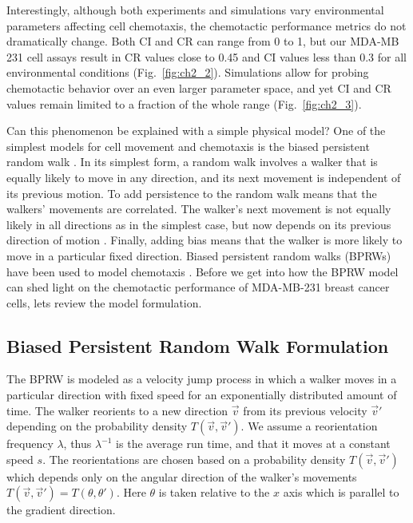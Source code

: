 Interestingly, although both experiments and simulations vary environmental parameters affecting cell chemotaxis, the chemotactic performance metrics do not dramatically change. Both CI and CR can range from 0 to 1, but our MDA-MB 231 cell assays result in CR values close to 0.45 and CI values less than 0.3 for all environmental conditions (Fig.\ \ref{fig:ch2_2}). Simulations allow for probing chemotactic behavior over an even larger parameter space, and yet CI and CR values remain limited to a fraction of the whole range (Fig.\ \ref{fig:ch2_3}).

Can this phenomenon be explained with a simple physical model? One of the simplest models for cell movement and chemotaxis is the biased persistent random walk \cite{alt1980biased,othmer1988models}. In its simplest form, a random walk involves a walker that is equally likely to move in any direction, and its next movement is independent of its previous motion. To add persistence to the random walk means that the walkers' movements are correlated. The walker's next movement is not equally likely in all directions as in the simplest case, but now depends on its previous direction of motion \cite{patlak1953random}. Finally, adding bias means that the walker is more likely to move in a particular fixed direction.
Biased persistent random walks (BPRWs) have been used to model chemotaxis \cite{alt1980biased,othmer1988models}. Before we get into how the BPRW model can shed light on the chemotactic performance of MDA-MB-231 breast cancer cells, lets review the model formulation.

\subsection{Biased Persistent Random Walk Formulation}

The BPRW is modeled as a velocity jump process in which a walker moves in a particular direction with fixed speed for an exponentially distributed amount of time. The walker reorients to a new direction $\vec{v}$ from its previous velocity $\vec{v}'$ depending on the probability density $T(\vec{v},\vec{v}')$. We assume a reorientation frequency $\lambda$, thus $\lambda^{-1}$ is the average run time, and that it moves at a constant speed $s$. The reorientations are chosen based on a probability density $T(\vec{v},\vec{v}')$ which depends only on the angular direction of the walker's movements $T(\vec{v},\vec{v}') = T(\theta,\theta')$. Here $\theta$ is taken relative to the $x$ axis which is parallel to the gradient direction.

